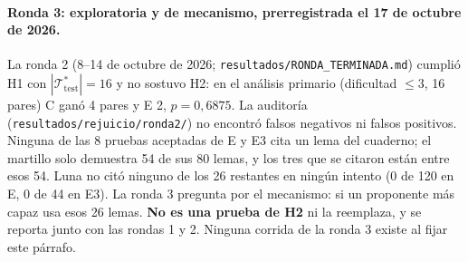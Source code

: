 \documentclass[11pt]{article}
\theoremstyle{remark}
\newcommand{\T}{\mathcal{T}}
\newcommand{\1}{\mathbb{1}}
\begin{document}
\paragraph{Ronda 3: exploratoria y de mecanismo, prerregistrada el 17 de octubre de 2026.} La ronda 2 (8--14 de octubre de 2026; \texttt{resultados/RONDA\_TERMINADA.md}) cumplió H1 con $|\T^*_{\mathrm{test}}|=16$ y no sostuvo H2: en el análisis primario (dificultad $\le 3$, 16 pares) C ganó 4 pares y E 2, $p=0{,}6875$. La auditoría (\texttt{resultados/rejuicio/ronda2/}) no encontró falsos negativos ni falsos positivos. Ninguna de las 8 pruebas aceptadas de E y E3 cita un lema del cuaderno; el martillo solo demuestra 54 de sus 80 lemas, y los tres que se citaron están entre esos 54. Luna no citó ninguno de los 26 restantes en ningún intento (0 de 120 en E, 0 de 44 en E3). La ronda 3 pregunta por el mecanismo: si un proponente más capaz usa esos 26 lemas. \textbf{No es una prueba de H2} ni la reemplaza, y se reporta junto con las rondas 1 y 2. Ninguna corrida de la ronda 3 existe al fijar este párrafo.
\end{document}
